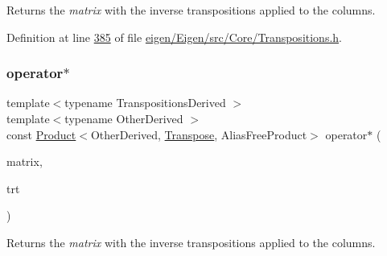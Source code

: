 \begin{DoxyReturn}{Returns}
the {\itshape matrix} with the inverse transpositions applied to the columns. 
\end{DoxyReturn}


Definition at line \hyperlink{eigen_2_eigen_2src_2_core_2_transpositions_8h_source_l00385}{385} of file \hyperlink{eigen_2_eigen_2src_2_core_2_transpositions_8h_source}{eigen/\+Eigen/src/\+Core/\+Transpositions.\+h}.

\mbox{\label{class_eigen_1_1_transpose_3_01_transpositions_base_3_01_transpositions_derived_01_4_01_4_af58db34e3932489e71803efae5dd3207}} 
\subsubsection{\texorpdfstring{operator$\ast$}{operator*}\hspace{0.1cm}{\footnotesize\ttfamily [2/2]}}
{\footnotesize\ttfamily template$<$typename Transpositions\+Derived $>$ \\
template$<$typename Other\+Derived $>$ \\
const \hyperlink{group___core___module_class_eigen_1_1_product}{Product}$<$Other\+Derived, \hyperlink{group___core___module_class_eigen_1_1_transpose}{Transpose}, Alias\+Free\+Product$>$ operator$\ast$ (\begin{DoxyParamCaption}\item[{const \hyperlink{group___core___module_class_eigen_1_1_matrix_base}{Matrix\+Base}$<$ Other\+Derived $>$ \&}]{matrix,  }\item[{const \hyperlink{group___core___module_class_eigen_1_1_transpose}{Transpose}$<$ \hyperlink{class_eigen_1_1_transpositions_base}{Transpositions\+Base}$<$ Transpositions\+Derived $>$ $>$ \&}]{trt }\end{DoxyParamCaption})\hspace{0.3cm}{\ttfamily [friend]}}

\begin{DoxyReturn}{Returns}
the {\itshape matrix} with the inverse transpositions applied to the columns. 
\end{DoxyReturn}


